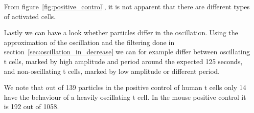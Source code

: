 From figure~\ref{fig:positive_control}, it is not apparent that there are different types of activated cells.

Lastly we can have a look whether particles differ in the oscillation. Using the approximation of the oscillation and the filtering done in section~\ref{sec:oscillation_in_decrease} we can for example differ between oscillating t cells, marked by high amplitude and period around the expected 125 seconds, and non-oscillating t cells, marked by low amplitude or different period.

We note that out of 139 particles in the positive control of human t cells only 14 have the behaviour of a heavily oscillating t cell. In the mouse positive control it is 192 out of 1058.